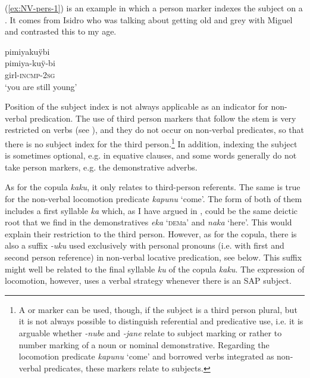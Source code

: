 (\ref{ex:NV-pers-1}) is an example in which a person marker indexes the subject on a . It comes from Isidro who was talking about getting old and grey with Miguel and contrasted this to my age.

\ea\label{ex:NV-pers-1}
\begingl
\glpreamble pimiyakuÿbi\\
\gla pimiya-kuÿ-bi\\
\glb girl-\textsc{incmp}-2\textsc{sg}\\
\glft ‘you are still young’
\endgl
\trailingcitation{[mdx-c120416ls.152]}
\xe


Position of the subject index is not always applicable as an indicator for non-verbal predication. The use of third person markers that follow the stem is very restricted on verbs (see ), and they do not occur on non-verbal predicates, so that there is no subject index for the third person.\footnote{A  or  marker can be used, though, if the subject is a third person plural, but it is not always possible to distinguish referential and predicative use, i.e. it is arguable whether \textit{-nube} and \textit{-jane} relate to subject marking or rather to number marking of a noun or nominal demonstrative. Regarding the locomotion predicate \textit{kapunu} ‘come’ and borrowed verbs integrated as non-verbal predicates, these markers relate to subjects.} In addition, indexing the subject is sometimes optional, e.g. in equative clauses, and some words generally do not take person markers, e.g. the demonstrative adverbs.

As for the copula \textit{kaku}, it only relates to third-person referents. The same is true for the non-verbal locomotion predicate \textit{kapunu} ‘come’. The form of both of them includes a first syllable \textit{ka} which, as I have argued in , could be the same deictic root that we find in the demonstratives \textit{eka} ‘\textsc{dem}a’ and \textit{naka} ‘here’. This would explain their restriction to the third person. However, as for the copula, there is also a suffix \textit{-uku} used exclusively with personal pronouns (i.e. with first and second person reference) in non-verbal locative predication, see  below. This suffix might well be related to the final syllable \textit{ku} of the copula \textit{kaku}. The expression of locomotion, however, uses a verbal strategy whenever there is an SAP subject.

